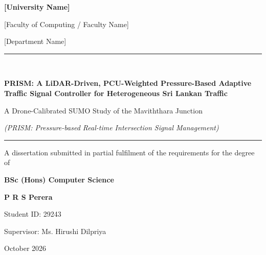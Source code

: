 
\begin{titlepage}
\thispagestyle{empty}
\begin{center}
\vspace*{0.5cm}
{\Large\bfseries [University Name]\par}
\vspace{0.3cm}
{\large [Faculty of Computing / Faculty Name]\par}
\vspace{0.2cm}
{\large [Department Name]\par}

\vspace{1.8cm}
\rule{\textwidth}{1pt}\\[0.5cm]
{\LARGE\bfseries PRISM: A LiDAR-Driven, PCU-Weighted Pressure-Based Adaptive Traffic Signal Controller for Heterogeneous Sri Lankan Traffic\par}
\vspace{0.4cm}
{\Large A Drone-Calibrated SUMO Study of the Maviththara Junction\par}
\vspace{0.3cm}
{\normalsize\itshape (PRISM: Pressure-based Real-time Intersection Signal Management)\par}
\rule{\textwidth}{1pt}

\vspace{1.8cm}
{\large A dissertation submitted in partial fulfilment of the requirements for the degree of\par}
\vspace{0.2cm}
{\large\bfseries BSc (Hons) Computer Science\par}

\vspace{2.0cm}
{\large\bfseries P R S Perera\par}
\vspace{0.2cm}
{\large Student ID: 29243\par}

\vspace{1.2cm}
{\large Supervisor: Ms. Hirushi Dilpriya\par}

\vfill
{\large October 2026\par}
\end{center}
\end{titlepage}
\setcounter{page}{2}


